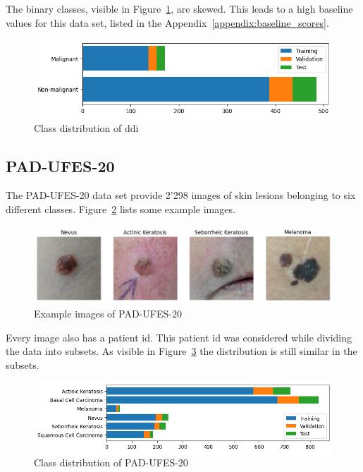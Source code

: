 The binary classes, visible in Figure~\ref{fig:class_distribution_of_ddi}, are skewed. This leads to a high baseline values for this data set, listed in the Appendix~\ref{appendix:baseline_scores}.

\begin{figure}[H]
    \begin{center}
    \includegraphics[width=15cm]{../images/class_distribution_of_ddi.png}
    \caption{Class distribution of \gls{ddi}}\label{fig:class_distribution_of_ddi}
    \end{center}
\end{figure}


\subsection{PAD-UFES-20}
The PAD-UFES-20 data set provide 2'298 images of skin lesions belonging to six different classes. 
Figure~\ref{fig:example_images_of_pad-ufes-20} lists some example images.

\begin{figure}[H]
    \begin{center}
    \includegraphics[width=15cm]{../images/example_images_of_pad-ufes-20.png}
    \caption{Example images of PAD-UFES-20}\label{fig:example_images_of_pad-ufes-20}
    \end{center}
\end{figure}

Every image also has a patient id. This patient id was considered while dividing the data into subsets. As visible in Figure~\ref{fig:class_distribution_of_pad-ufes-20} the distribution is still similar in the subsets. 

\begin{figure}[H]
    \begin{center}
    \includegraphics[width=15cm]{../images/class_distribution_of_pad-ufes-20.png}
    \caption{Class distribution of PAD-UFES-20}\label{fig:class_distribution_of_pad-ufes-20}
    \end{center}
\end{figure}


